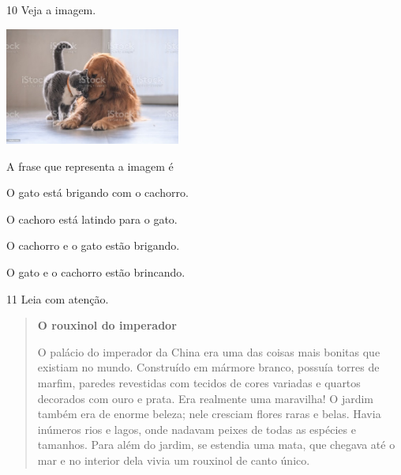 

\num{10} Veja a imagem.

\includegraphics[width=2.27539in,height=1.51515in]{media/image158.jpeg}


A frase que representa a imagem é

\begin{escolha}
\item O gato está brigando com o cachorro.

\item O cachoro está latindo para o gato.

\item O cachorro e o gato estão brigando.

\item O gato e o cachorro estão brincando.
\end{escolha}


\num{11} Leia com atenção.

\begin{quote}
\textbf{O rouxinol do imperador}

O palácio do imperador da China era uma das coisas mais
bonitas que existiam no mundo. Construído em mármore
branco, possuía torres de marfim, paredes revestidas com
tecidos de cores variadas e quartos decorados com ouro e
prata. Era realmente uma maravilha!
O jardim também era de enorme beleza; nele cresciam
flores raras e belas. Havia inúmeros rios e lagos, onde
nadavam peixes de todas as espécies e tamanhos.
Para além do jardim, se estendia uma mata, que
chegava até o mar e no interior dela vivia um rouxinol de
canto único.
\end{quote}

